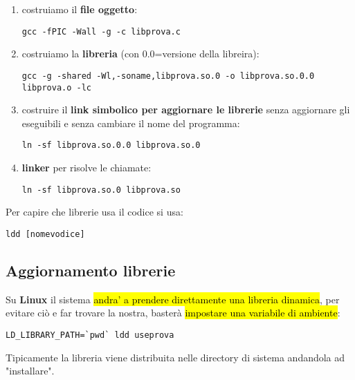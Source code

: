\begin{enumerate}
	\item costruiamo il \textbf{file oggetto}:

\begin{lstlisting}
gcc -fPIC -Wall -g -c libprova.c
\end{lstlisting}

	\item costruiamo la \textbf{libreria} (con 0.0=versione della libreira):

\begin{lstlisting}
gcc -g -shared -Wl,-soname,libprova.so.0 -o libprova.so.0.0 libprova.o -lc 
\end{lstlisting}

	\item costruire il \textbf{link simbolico per aggiornare le librerie} senza aggiornare gli eseguibili e senza cambiare il nome del programma:

\begin{lstlisting}
ln -sf libprova.so.0.0 libprova.so.0 
\end{lstlisting}

	\item \textbf{linker} per risolve le chiamate:

\begin{lstlisting}
ln -sf libprova.so.0 libprova.so
\end{lstlisting}

\end{enumerate}


Per capire che librerie usa il codice si usa:

\begin{lstlisting}
ldd [nomevodice]
\end{lstlisting}


\subsection{Aggiornamento librerie}

Su \textbf{Linux} il sistema \hl{andra' a prendere direttamente una libreria dinamica}, per evitare ciò e far trovare la nostra, basterà \hl{impostare una variabile di ambiente}:

\begin{lstlisting}
LD_LIBRARY_PATH=`pwd` ldd useprova
\end{lstlisting}

Tipicamente la libreria viene distribuita nelle directory di sistema andandola ad "installare".


